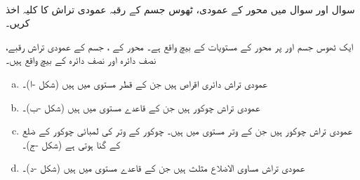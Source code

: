 \\
سوال  اور سوال  میں محور  کے عمودی، ٹھوس جسم کے رقبہ عمودی تراش  کا کلیہ اخذ کریں۔ 

ایک ٹھوس جسم   اور  پر محور   کے  مستویات  کے بیچ  واقع  ہے۔  محور  کے ، جسم  کے  عمودی تراش رقبے،  نصف دائرہ  اور نصف دائرہ  کے بیچ  واقع ہیں۔ 
\begin{enumerate}[a.]
\item
عمودی تراش دائری  اقراص  ہیں جن کے قطر مستوی   میں ہیں (شکل -ا)۔
\item
عمودی تراش چوکور ہیں جن کے قاعدے مستوی   میں ہیں (شکل -ب)۔
\item
عمودی تراش چوکور ہیں جن کے وتر مستوی   میں ہیں۔ چوکور کے وتر کی لمبائی چوکور کے ضلع کے  گنا ہوتی ہے (شکل -ج)۔
\item
عمودی تراش مساوی الاضلاع مثلث ہیں جن کے قاعدے مستوی   میں ہیں (شکل -د)۔
\end{enumerate}
